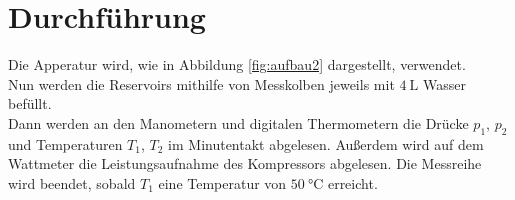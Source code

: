 \section{Durchführung}
\label{sec:Durchführung}
Die Apperatur wird, wie in Abbildung \ref{fig:aufbau2} dargestellt, verwendet.\\
Nun werden die Reservoirs mithilfe von Messkolben jeweils mit $\SI{4}{\liter}$ Wasser befüllt.\\
Dann werden an den Manometern und digitalen Thermometern die Drücke $p_1$, $p_2$ und Temperaturen
$T_1$, $T_2$ im Minutentakt abgelesen. Außerdem wird auf dem Wattmeter die Leistungsaufnahme des Kompressors abgelesen.
Die Messreihe wird beendet, sobald $T_1$ eine Temperatur von $\SI{50}{\celsius}$ erreicht.